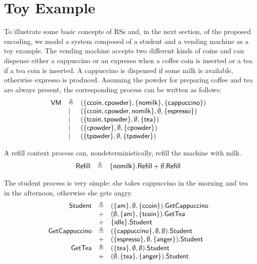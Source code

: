 
\section{Toy Example}\label{sec:student}

To illustrate some basic concepts of RSs and, in the next section, of the proposed encoding, we model a system composed of a student and a vending machine as a toy example.
The vending machine accepts two different kinds of coins and can dispense either a cappuccino or an expresso when a coffee coin is inserted or a tea if a tea coin is inserted. A cappuccino is dispensed if some milk is available, otherwise expresso is produced.
Assuming the powder for preparing coffee and tea are always present, the corresponding process can be written as follows:
\[
\begin{array}{lll}
\mathsf{VM} & \triangleq & (\{{\text{\sffamily ccoin}},{\text{\sffamily cpowder}}\},\{{\text{\sffamily nomilk}}\},\{{\text{\sffamily cappuccino}}\})\\
& | & (\{{\text{\sffamily ccoin}},{\text{\sffamily cpowder}},{\text{\sffamily nomilk}}\},\emptyset,\{{\text{\sffamily espresso}}\})\\
& | & (\{{\text{\sffamily tcoin}},{\text{\sffamily tpowder}}\},\emptyset,\{{\text{\sffamily tea}}\})\\
& | & (\{{\text{\sffamily cpowder}}\},\emptyset,\{{\text{\sffamily cpowder}}\})\\
& | & (\{{\text{\sffamily tpowder}}\},\emptyset,\{{\text{\sffamily tpowder}}\})\\
\end{array}
\]

A refill context process can, nondeterministically, refill the machine with milk.
\[
\begin{array}{lll}
\mathsf{Refill} & \triangleq & \{{\text{\sffamily nomilk}}\}.\mathsf{Refill}
+ \emptyset.\mathsf{Refill}
\end{array}
\]

The student process is very simple: she takes cappuccino in the morning and tea in the afternoon, otherwise she gets angry.
\[
\begin{array}{rll}
\mathsf{Student} & \triangleq & (\{{\text{\sffamily am}}\},\emptyset,\{{\text{\sffamily ccoin}}\}).\mathsf{GetCappuccino}\\
& + & (\emptyset,\{{\text{\sffamily am}}\},\{{\text{\sffamily tcoin}}\}).\mathsf{GetTea}\\
& + & \{{\text{\sffamily idle}}\}.\mathsf{Student}\\
\mathsf{GetCappuccino} & \triangleq & (\{{\text{\sffamily cappuccino}}\},\emptyset,\emptyset).\mathsf{Student}\\
& + & (\{{\text{\sffamily espresso}}\},\emptyset,\{{\text{\sffamily anger}}\}).\mathsf{Student}\\
\mathsf{GetTea} & \triangleq & (\{{\text{\sffamily tea}}\},\emptyset,\emptyset).\mathsf{Student}\\
& + & (\emptyset,\{{\text{\sffamily tea}}\},\{{\text{\sffamily anger}}\}).\mathsf{Student}\\
\end{array}
\]

